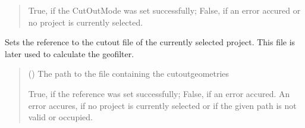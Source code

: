 \documentclass[letterpaper,10pt,english]{sphinxmanual}
\begin{document}
\begin{fulllineitems}
\begin{fulllineitems}
\begin{quote}
\begin{description}
\sphinxAtStartPar
True, if the CutOutMode was set successfully; False, if an error accured or no project is currently selected.

\sphinxAtStartPar
{}

\end{description}\end{quote}

\end{fulllineitems}


\begin{fulllineitems}
\label{\detokenize{apidoc/src.osm_configurator.control:src.osm_configurator.control.cut_out_controller.CutOutController.set_cut_out_reference}}
\pysigstartsignatures
{}
\pysigstopsignatures
\sphinxAtStartPar
Sets the reference to the cut\sphinxhyphen{}out file of the currently selected project.
This file is later used to calculate the geofilter.
\begin{quote}\begin{description}
\sphinxAtStartPar
{} () \textendash{} The path to the file containing the cut\sphinxhyphen{}out\sphinxhyphen{}geometries

\sphinxAtStartPar
True, if the reference was set successfully; False, if an error accured. An error accures, if no project is currently selected or if the given path is not valid or occupied.

\sphinxAtStartPar
{}

\end{description}\end{quote}

\end{fulllineitems}



\end{fulllineitems}
\end{document}
